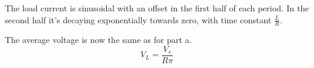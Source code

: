 \subsection{}

\begin{center}
       
    \vspace{2cm} \\
       
\end{center}

The load current is sinusoidal with an offset in the first half of each period.
In the second half it's decaying exponentially towards zero, with time constant $\frac{L}{R}$.


The average voltage is now the same as for part a.
$$
V_L = \frac{V_s}{R\pi}
$$